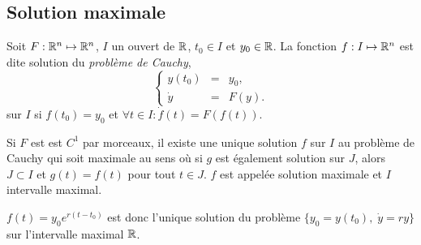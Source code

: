 \subsection{Solution maximale} 

\begin{definition}
  Soit $F : \mathbb{R}^n \mapsto \mathbb{R}^n$, $I$ un ouvert de $\mathbb{R}$, $t_0 \in I$ et $y_0 \in \mathbb{R}$. La fonction $f : I \mapsto \mathbb{R}^n$ est dite solution du \emph{problème de Cauchy}, 
  $$
  \left\{\begin{array}{rcl}
          y(t_0) & = & y_0, \\
          \dot y & = & F(y).
        \end{array}\right.
  $$
  sur $I$ si $f(t_0) = y_0$ et $\forall t \in I: \dot f(t) = F(f(t))$.
\end{definition}

\begin{theorem}
  Si $F$ est est $C^1$ par morceaux, il existe une unique solution $f$ sur $I$ au problème de Cauchy qui soit maximale au sens où si $g$ est également solution sur $J$, alors $J \subset I$ et $g(t) = f(t)$ pour tout $t \in J$. $f$ est appelée solution maximale et $I$ intervalle maximal.
\end{theorem}

\remark
$f(t) = y_0 e^{r(t-t_0)}$ est donc l'unique solution du problème $\{y_0 = y(t_0), \; \dot y = r y\}$ sur l'intervalle maximal $\mathbb{R}$.


